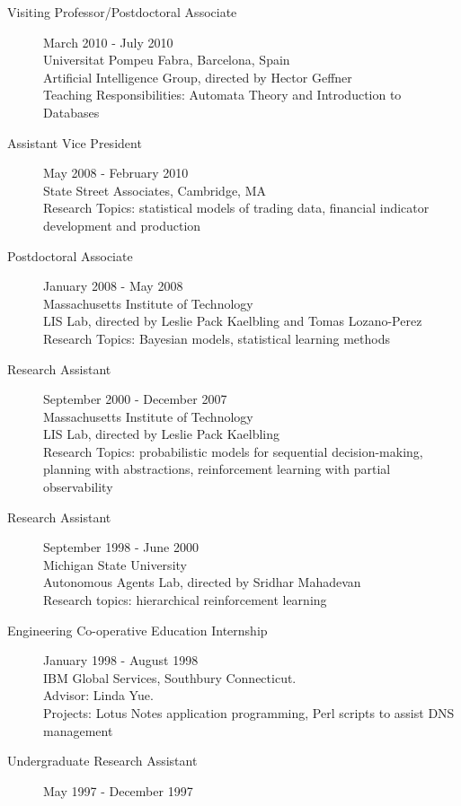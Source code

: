 \documentclass[overlapped,line,letterpaper]{res}
\begin{document}
\begin{resume}
\begin{description}
\item [Visiting Professor/Postdoctoral Associate] \dotfill March 2010 - July 2010 \\
Universitat Pompeu Fabra, Barcelona, Spain \\
Artificial Intelligence Group, directed by Hector Geffner\\
Teaching Responsibilities: Automata Theory and Introduction to Databases 
\item [Assistant Vice President] \dotfill May 2008 - February 2010 \\
State Street Associates, Cambridge, MA \\
Research Topics: statistical models of trading data, financial indicator development and production
\item [Postdoctoral Associate] \dotfill January 2008 - May 2008 \\
Massachusetts Institute of Technology \\
LIS Lab, directed by Leslie Pack Kaelbling and Tomas Lozano-Perez \\
Research Topics: Bayesian models, statistical learning methods
\item [Research Assistant] \dotfill September 2000 - December 2007\\
Massachusetts Institute of Technology\\
LIS Lab, directed by Leslie Pack Kaelbling  \\
Research Topics: probabilistic models for sequential decision-making, planning with abstractions, reinforcement learning with partial observability
\item [Research Assistant] \dotfill September 1998 - June 2000\\
Michigan State University\\
Autonomous Agents Lab, directed by Sridhar Mahadevan\\
Research topics: hierarchical reinforcement learning
\item [Engineering Co-operative Education Internship] \dotfill  January 1998 - August 1998\\
IBM Global Services, Southbury Connecticut. \\
Advisor: Linda Yue.\\
Projects: Lotus Notes application programming, Perl scripts to assist DNS management 
\item [Undergraduate Research Assistant] \dotfill May 1997 - December 1997 \\

\end{description}
\end{resume}
\end{document}

